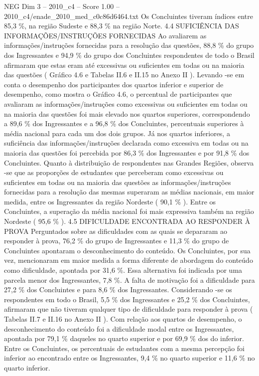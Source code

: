 \begin{textsample}{NEG Dim 3 – 2010\_c4 – Score 1.00 – 2010\_c4/enade\_2010\_med\_c0c86d6464.txt}
Os Concluintes tiveram índices entre 85,3 \%, na região Sudeste e 88,3 \% na região Norte. 4.4 SUFICIÊNCIA DAS INFORMAÇÕES/INSTRUÇÕES FORNECIDAS Ao avaliarem as informações/instruções fornecidas para a resolução das questões, 88,8 \% do grupo dos Ingressantes e 94,9 \% do grupo dos Concluintes respondentes de todo o Brasil afirmaram que estas eram até excessivas ou suficientes em todas ou na maioria das questões ( Gráfico 4.6 e Tabelas II.6 e II.15 no Anexo II ).
Levando -se em conta o desempenho dos participantes dos quartos inferior e superior de desempenho, como mostra o Gráfico 4.6, o percentual de participantes que avaliaram as informações/instruções como excessivas ou suficientes em todas ou na maioria das questões foi mais elevado nos quartos superiores, correspondendo a 89,6 \% dos Ingressantes e a 96,8 \% dos Concluintes, percentuais superiores à média nacional para cada um dos dois grupos.
Já nos quartos inferiores, a suficiência das informações/instruções declarada como excessiva em todas ou na maioria das questões foi percebida por 86,3 \% dos Ingressantes e por 91,8 \% dos Concluintes.
Quanto à distribuição de respondentes nas Grandes Regiões, observa -se que as proporções de estudantes que perceberam como excessivas ou suficientes em todas ou na maioria das questões as informações/instruções fornecidas para a resolução das mesmas superaram as médias nacionais, em maior medida, entre os Ingressantes da região Nordeste ( 90,1 \% ).
Entre os Concluintes, a superação da média nacional foi mais expressiva também na região Nordeste ( 95,6 \% ). 4.5 DIFICULDADE ENCONTRADA AO RESPONDER À PROVA Perguntados sobre as dificuldades com as quais se depararam ao responder à prova, 76,2 \% do grupo de Ingressantes e 11,3 \% do grupo de Concluintes apontaram o desconhecimento do conteúdo.
Os Concluintes, por sua vez, mencionaram em maior medida a forma diferente de abordagem do conteúdo como dificuldade, apontada por 31,6 \%.
Essa alternativa foi indicada por uma parcela menor dos Ingressantes, 7,8 \%.
A falta de motivação foi a dificuldade para 27,2 \% dos Concluintes e para 8,6 \% dos Ingressantes.
Considerando -se os respondentes em todo o Brasil, 5,5 \% dos Ingressantes e 25,2 \% dos Concluintes, afirmaram que não tiveram qualquer tipo de dificuldade para responder à prova ( Tabelas II.7 e II.16 no Anexo II ).
Com relação aos quartos de desempenho, o desconhecimento do conteúdo foi a dificuldade modal entre os Ingressantes, apontada por 79,1 \% daqueles no quarto superior e por 69,9 \% dos do inferior.
Entre os Concluintes, os percentuais de estudantes com a mesma percepção foi inferior ao encontrado entre os Ingressantes, 9,4 \% no quarto superior e 11,6 \% no quarto inferior.

\end{textsample}
